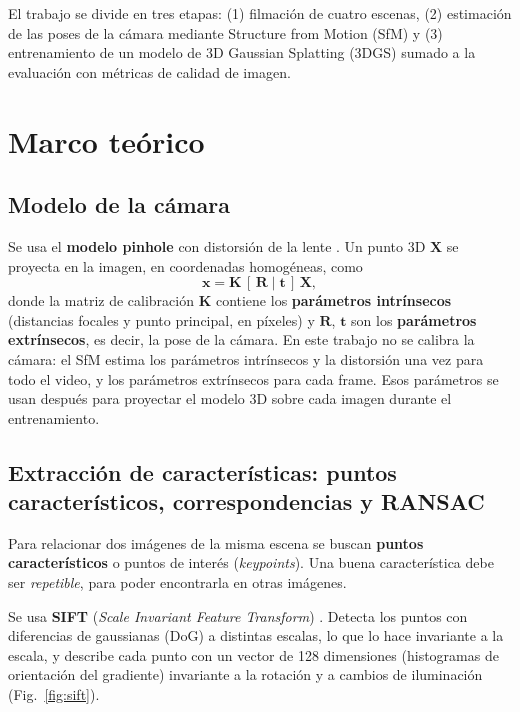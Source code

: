 \documentclass[conference,a4paper]{IEEEtran}
\begin{document}
El trabajo se divide en tres etapas: (1) filmación de cuatro escenas, (2) estimación de las poses de la cámara mediante Structure from Motion (SfM) y (3) entrenamiento de un modelo de 3D Gaussian Splatting (3DGS) sumado a la  evaluación con métricas de calidad de imagen.

\section{Marco teórico}

\subsection{Modelo de la cámara}

Se usa el \textbf{modelo pinhole} con distorsión de la lente \cite{catedraU2}. Un punto 3D $\mathbf{X}$ se proyecta en la imagen, en coordenadas homogéneas, como
\begin{equation}
\mathbf{x} = \mathbf{K}\,[\,\mathbf{R}\;|\;\mathbf{t}\,]\,\mathbf{X},
\end{equation}
donde la matriz de calibración $\mathbf{K}$ contiene los \textbf{parámetros intrínsecos} (distancias focales y punto principal, en píxeles) y $\mathbf{R}$, $\mathbf{t}$ son los \textbf{parámetros extrínsecos}, es decir, la pose de la cámara. En este trabajo no se calibra la cámara: el SfM estima los parámetros intrínsecos y la distorsión una vez para todo el video, y los parámetros extrínsecos para cada frame. Esos parámetros se usan después para proyectar el modelo 3D sobre cada imagen durante el entrenamiento.

\subsection{Extracción de características: puntos característicos, correspondencias y RANSAC}

Para relacionar dos imágenes de la misma escena se buscan \textbf{puntos característicos} o puntos de interés (\textit{keypoints}). Una buena característica debe ser \textit{repetible}, para poder encontrarla en otras imágenes.

Se usa \textbf{SIFT} (\textit{Scale Invariant Feature Transform}) \cite{catedraU3}. Detecta los puntos con diferencias de gaussianas (DoG) a distintas escalas, lo que lo hace invariante a la escala, y describe cada punto con un vector de 128 dimensiones (histogramas de orientación del gradiente) invariante a la rotación y a cambios de iluminación (Fig.~\ref{fig:sift}).
\end{document}
